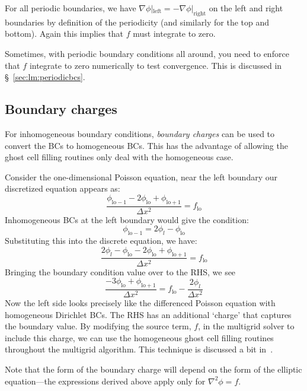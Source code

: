 For all periodic boundaries, we have $\nabla \phi
|_\mathrm{left} = -\nabla \phi |_\mathrm{right}$ on the left and right
boundaries by definition of the periodicity (and similarly for the top
and bottom).  Again this implies that $f$ must integrate to zero.

Sometimes, with periodic boundary conditions all around, you need to
enforce that $f$ integrate to zero numerically to test convergence.
This is discussed in \S~\ref{sec:lm:periodicbcs}.


\subsection{Boundary charges}

For inhomogeneous boundary conditions, {\em boundary charges} can be
used to convert the BCs to homogeneous BCs.  This has the advantage of
allowing the ghost cell filling routines only deal with the
homogeneous case.

Consider the one-dimensional Poisson equation, near the left boundary
our discretized equation appears as:
\begin{equation}
\frac{\phi_\mathrm{lo-1} - 2\phi_\mathrm{lo} + \phi_\mathrm{lo+1}}{\Delta x^2}
 = f_\mathrm{lo}
\end{equation}
Inhomogeneous BCs at the left boundary would give the condition:
\begin{equation}
\phi_\mathrm{lo-1} = 2 \phi_l - \phi_\mathrm{lo}
\end{equation}
Substituting this into the discrete equation, we have:
\begin{equation}
\frac{2 \phi_l - \phi_\mathrm{lo} - 2\phi_\mathrm{lo} + \phi_\mathrm{lo+1}}{\Delta x^2}
 = f_\mathrm{lo}
\end{equation}
Bringing the boundary condition value over to the RHS, we see
\begin{equation}
\frac{- 3\phi_\mathrm{lo} + \phi_\mathrm{lo+1}}{\Delta x^2}
 = f_\mathrm{lo} - \frac{2\phi_l}{\Delta x^2}
\end{equation}
Now the left side looks precisely like the differenced Poisson equation
with homogeneous Dirichlet BCs.  The RHS has an additional `charge' that
captures the boundary value.  By modifying the source term, $f$, in the
multigrid solver to include this charge, we can use the homogeneous 
ghost cell filling routines throughout the multigrid algorithm.
This technique is discussed a bit in~\cite{colellanotes}.

Note that the form of the boundary charge will depend on the form of the
elliptic equation---the expressions derived above apply only for
$\nabla^2 \phi = f$.



